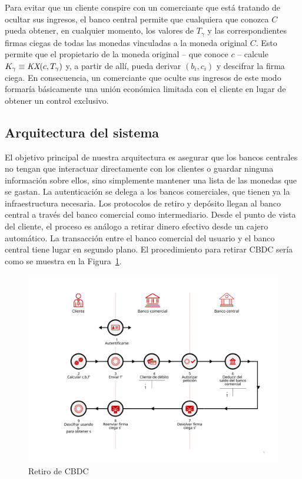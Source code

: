 \documentclass[a4paper,10pt]{article} %
\begin{document}
Para evitar que un cliente conspire con un comerciante que está tratando
de ocultar sus ingresos, el banco central permite que cualquiera que
conozca $C$ pueda obtener, en cualquier momento, los valores de
$T_{\gamma}$ y las correspondientes firmas ciegas de todas las monedas
vinculadas a la moneda original $C$. Esto permite que el propietario de la
moneda original -- que conoce $c$ -- calcule
$K_{\gamma} \equiv \emph{KX}( c,T_{\gamma})$ y, a partir de
allí, pueda derivar $(b_{i},c_{i})$ y descifrar la firma
ciega. En consecuencia, un comerciante que oculte sus ingresos de este
modo formaría básicamente una unión económica limitada con el cliente en
lugar de obtener un control exclusivo.

\hypertarget{arquitectura-del-sistema}{%
\subsection{Arquitectura del sistema}\label{arquitectura-del-sistema}}

El objetivo principal de nuestra arquitectura es asegurar que los bancos
centrales no tengan que interactuar directamente con los clientes o
guardar ninguna información sobre ellos, sino simplemente mantener una
lista de las monedas que se gastan. La autenticación se delega a los
bancos comerciales, que tienen ya la infraestructura necesaria. Los
protocolos de retiro y depósito llegan al banco central a través del
banco comercial como intermediario. Desde el punto de vista del cliente,
el proceso es análogo a retirar dinero efectivo desde un cajero
automático. La transacción entre el banco comercial del usuario y el
banco central tiene lugar en segundo plano. El procedimiento para
retirar CBDC sería como se muestra en la Figura~\ref{fig:fig1}.

\begin{figure}[h!]
  \includegraphics[width=\textwidth]{retirada.pdf}
  \caption{Retiro de CBDC}
  \label{fig:fig1}
\end{figure}
\end{document}
